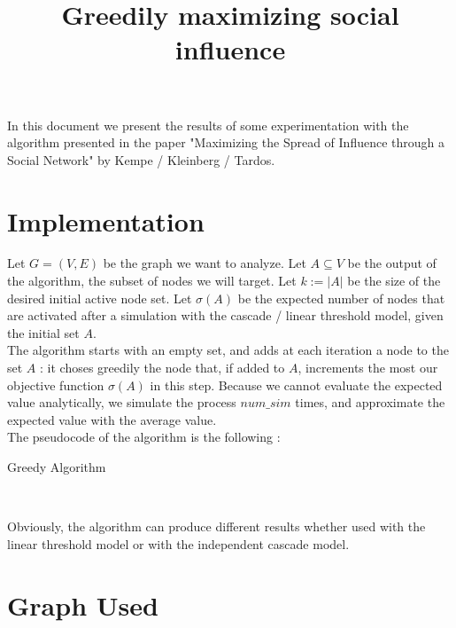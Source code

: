 \documentclass[paper=a4,fontsize=11pt,DIV=8,BCOR=5mm,twoside,pdftex]{scrartcl}
\title{Greedily maximizing social influence}
\begin{document}
	\maketitle
In this document we present the results of some experimentation with the algorithm presented in the paper "Maximizing the Spread of Influence through a Social Network" by Kempe / Kleinberg / Tardos.
	
	\section{Implementation}

Let $G = (V, E)$ be the graph we want to analyze. Let $A\subseteq V$ be the output of the algorithm, the subset of nodes we will target. Let $k := |A|$ be the size of the desired initial active node set. Let $\sigma(A)$ be the expected number of nodes that are activated after a simulation with the cascade / linear threshold model, given the initial set $A$.\\

The algorithm starts with an empty set, and adds at each iteration a node to the set $A$ : it choses greedily the node that, if added to $A$, increments the most our objective function $\sigma(A)$ in this step. Because we cannot evaluate the expected value analytically, we simulate the process $num\_sim$ times, and approximate the expected value with the average value.  \\

The pseudocode of the algorithm is the following : 

\begin{algorithm}[H]
	\caption{Greedy Algorithm}
	\begin{algorithmic}

				\EndFor
			\EndFor
		\EndWhile \\
	\end{algorithmic}
\end{algorithm}

Obviously, the algorithm can produce different results whether used with the linear threshold model or with the independent cascade model.

\section{Graph Used}
\end{document}
